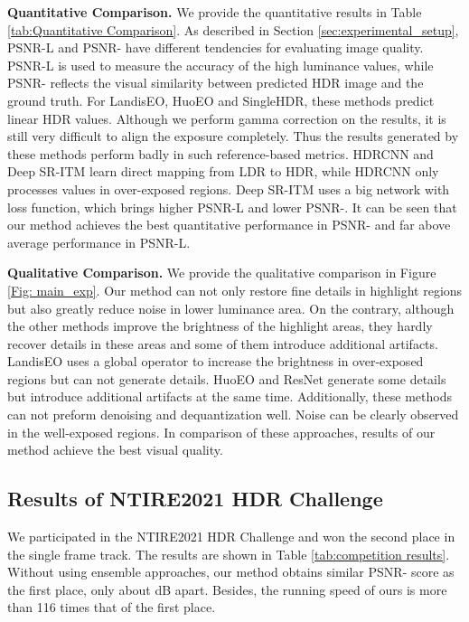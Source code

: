\documentclass[final]{cvpr}
\begin{document}
\textbf{Quantitative Comparison.}
We provide the quantitative results in Table \ref{tab:Quantitative Comparison}. As described in Section \ref{sec:experimental_setup}, PSNR-L and PSNR- have different tendencies for evaluating image quality. PSNR-L is used to measure the accuracy of the high luminance values, while PSNR- reflects the visual similarity between predicted HDR image and the ground truth. For LandisEO, HuoEO and SingleHDR, these methods predict linear HDR values. Although we perform gamma correction on the results, it is still very difficult to align the exposure completely. Thus the results generated by these methods perform badly in such reference-based metrics. HDRCNN and Deep SR-ITM learn direct mapping from LDR to HDR, while HDRCNN only processes values in over-exposed regions. Deep SR-ITM uses a big network with  loss function, which brings higher PSNR-L and lower PSNR-. It can be seen that our method achieves the best quantitative performance in PSNR- and far above average performance in PSNR-L.

\textbf{Qualitative Comparison.}
We provide the qualitative comparison in Figure \ref{Fig: main_exp}. Our method can not only restore fine details in highlight regions but also greatly reduce noise in lower luminance area. On the contrary, although the other methods improve the brightness of the highlight areas, they hardly recover details in these areas and some of them introduce additional artifacts. LandisEO uses a global operator to increase the brightness in over-exposed regions but can not generate details. HuoEO and ResNet generate some details but introduce additional artifacts at the same time. Additionally, these methods can not preform denoising and dequantization well. Noise can be clearly observed in the well-exposed regions. In comparison of these approaches, results of our method achieve the best visual quality.  

\subsection{Results of NTIRE2021 HDR Challenge}
We participated in the NTIRE2021 HDR Challenge \cite{perez2021ntire} and won the second place in the single frame track. The results are shown in Table \ref{tab:competition results}. Without using ensemble approaches, our method obtains similar PSNR- score as the first place, only about  dB apart. Besides, the running speed of ours is more than 116 times that of the first place.
\end{document}
